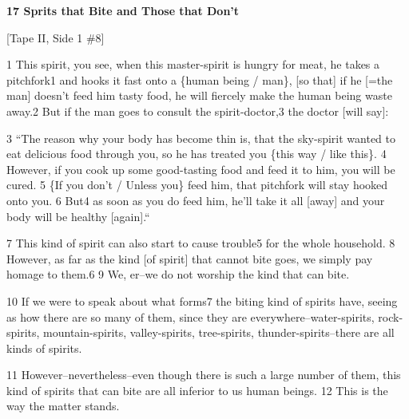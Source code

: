 
\textbf{17 Sprits that Bite and Those that Don't}

[Tape II, Side 1 \#8]

1 This spirit, you see, when this master-spirit is hungry for meat, he takes a
pitchfork1 and hooks it fast onto a \{human being / man\}, [so that] if he [=the
man] doesn't feed him tasty food, he will fiercely make the human being waste away.2
But if the man goes to consult the spirit-doctor,3 the doctor [will say]:

3 ``The reason why your body has become thin is, that the sky-spirit wanted
to eat delicious food through you, so he has treated you \{this way / like this\}.
4 However, if you cook up some good-tasting food and feed it to him, you will be
cured. 5 \{If you don't / Unless you\} feed him, that pitchfork will stay hooked
onto you. 6 But4 as soon as you do feed him, he'll take it all [away] and your
body will be healthy [again].``

7 This kind of spirit can also start to cause trouble5 for the whole household.
8 However, as far as the kind [of spirit] that cannot bite goes, we simply pay
homage to them.6 9 We, er--we do not worship the kind that can bite.

10 If we were to speak about what forms7 the biting kind of spirits have, seeing
as how there are so many of them, since they are everywhere--water-spirits, rock-spirits,
mountain-spirits, valley-spirits, tree-spirits, thunder-spirits--there are all
kinds of spirits.

11 However--nevertheless--even though there is such a large number of them, this
kind of spirits that can bite are all inferior to us human beings. 12 This is the
way the matter stands.

